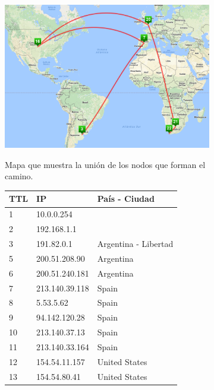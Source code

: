 \begin{figure}[ht]
  \hspace*{-0.4cm}
  \begin{subfigure}[b]{.60\textwidth}
    \includegraphics[width=\textwidth]{Imagenes/capetown_map.png}
    \label{fig:capetown_map}
    \caption{Mapa que muestra la unión de los nodos que forman el camino.}
  \end{subfigure}
  \begin{subfigure}[b]{.39\textwidth}
    \footnotesize
    \begin{tabular}{ l l l }
      \hline
      \textbf{TTL} & \textbf{IP} &  \textbf{País - Ciudad} \\ \hline
      1 & 10.0.0.254 &\\ \hline
      2 & 192.168.1.1 &\\ \hline
      \rowcolor[RGB]{196,214,255}
      3 & 191.82.0.1 & Argentina - Libertad\\ \hline
      5 & 200.51.208.90 & Argentina\\ \hline
      6 & 200.51.240.181 & Argentina\\ \hline
      7 & 213.140.39.118 & Spain\\ \hline
      \rowcolor[RGB]{196,214,255}
      8 & 5.53.5.62 & Spain\\ \hline
      9 & 94.142.120.28 & Spain\\ \hline
      10 & 213.140.37.13 & Spain\\ \hline
      11 & 213.140.33.164 & Spain\\ \hline
      \rowcolor[RGB]{196,214,255}
      12 & 154.54.11.157 & United States\\ \hline
      13 & 154.54.80.41 & United States\\ \hline

\end{tabular}
\end{subfigure}
\end{figure}
